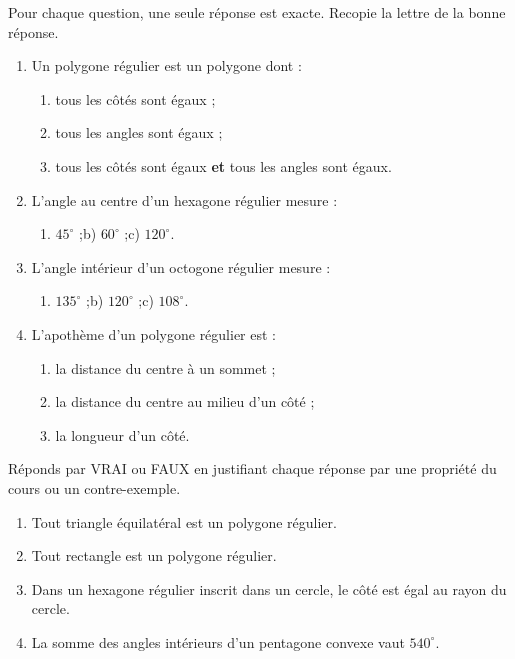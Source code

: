 \documentclass[11pt]{article}
\begin{document}
\begin{exercice}[QCM]
Pour chaque question, une seule réponse est exacte. Recopie la lettre de la bonne réponse.
\begin{enumerate}
\item Un polygone régulier est un polygone dont :
\begin{enumerate}
\item[a)] tous les côtés sont égaux ;
\item[b)] tous les angles sont égaux ;
\item[c)] tous les côtés sont égaux \textbf{et} tous les angles sont égaux.
\end{enumerate}
\item L'angle au centre d'un hexagone régulier mesure :
\begin{enumerate}
\item[a)] $45^{\circ}$ ;\qquad b) $60^{\circ}$ ;\qquad c) $120^{\circ}$.
\end{enumerate}
\item L'angle intérieur d'un octogone régulier mesure :
\begin{enumerate}
\item[a)] $135^{\circ}$ ;\qquad b) $120^{\circ}$ ;\qquad c) $108^{\circ}$.
\end{enumerate}
\item L'apothème d'un polygone régulier est :
\begin{enumerate}
\item[a)] la distance du centre à un sommet ;
\item[b)] la distance du centre au milieu d'un côté ;
\item[c)] la longueur d'un côté.
\end{enumerate}
\end{enumerate}
\end{exercice}

\begin{exercice}
Réponds par VRAI ou FAUX en justifiant chaque réponse par une propriété du cours ou un contre-exemple.
\begin{enumerate}
\item Tout triangle équilatéral est un polygone régulier.
\item Tout rectangle est un polygone régulier.
\item Dans un hexagone régulier inscrit dans un cercle, le côté est égal au rayon du cercle.
\item La somme des angles intérieurs d'un pentagone convexe vaut $540^{\circ}$.
\end{enumerate}
\end{exercice}
\end{document}
